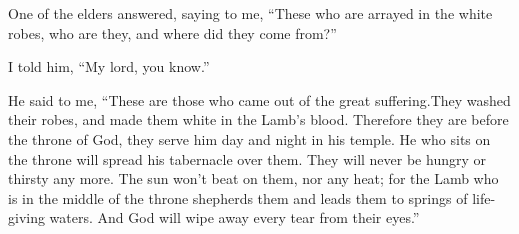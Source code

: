 {\par }{\PP {}One of the elders answered, saying to me, “These who are arrayed in the white robes, who are they, and where did they come from?”
\par }{\PP {}I told him, “My lord, you know.”
\par }{\PP He said to me, “These are those who came out of the great suffering.They washed their robes, and made them white in the Lamb’s blood.
Therefore they are before the throne of God, they serve him day and night in his temple. He who sits on the throne will spread his tabernacle over them.
They will never be hungry or thirsty any more. The sun won’t beat on them, nor any heat;
for the Lamb who is in the middle of the throne shepherds them and leads them to springs of life-giving waters. And God will wipe away every tear from their eyes.”

}
